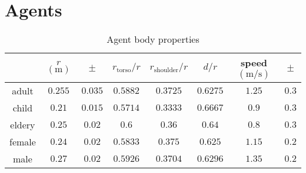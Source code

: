 \section{Agents}

\begin{table}[H]
\begin{tabular}{c|ccccccc}
& $ r $ $ (\mathrm{m}) $ & $ \pm $ & $ r_{\text{torso}} / r $ & $ r_{\text{shoulder}} / r $ & $ d / r $ & speed $ (\mathrm{m} / \mathrm{s}) $ & $ \pm $ \\
\hline\hline
adult & $ 0.255 $ & $ 0.035 $ & $ 0.5882 $ & $ 0.3725 $ & $ 0.6275 $ & $ 1.25 $ & $ 0.3 $ \\
child & $ 0.21 $ & $ 0.015 $ & $ 0.5714 $ & $ 0.3333 $ & $ 0.6667 $ & $ 0.9 $ & $ 0.3 $ \\
eldery & $ 0.25 $ & $ 0.02 $ & $ 0.6 $ & $ 0.36 $ & $ 0.64 $ & $ 0.8 $ & $ 0.3 $ \\
female & $ 0.24 $ & $ 0.02 $ & $ 0.5833 $ & $ 0.375 $ & $ 0.625 $ & $ 1.15 $ & $ 0.2 $ \\
male & $ 0.27 $ & $ 0.02 $ & $ 0.5926 $ & $ 0.3704 $ & $ 0.6296 $ & $ 1.35 $ & $ 0.2 $ \\
\end{tabular} 
\caption{Agent body properties}
\end{table} 


